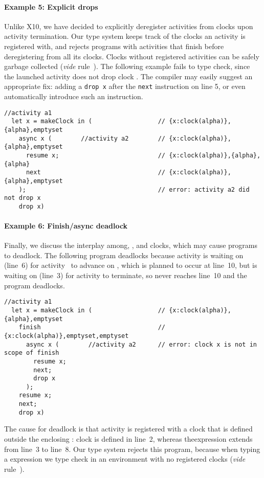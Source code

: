 \paragraph{Example 5: Explicit drops}

Unlike X10, we have decided to explicitly deregister activities from
clocks upon activity termination.
Our type system keeps track of the clocks an activity is registered
with, and rejects programs with activities that finish before
deregistering from all its clocks.
Clocks without registered activities can be safely garbage collected
(\textit{vide} rule~\Rdrop).
The following example fails to type check, since the launched
activity does not drop clock .
The compiler may easily suggest an appropriate fix: adding a
\lstinline|drop x| after the \lstinline|next| instruction on line 5,
or even automatically introduce such an instruction.
\begin{lstlisting}[numbers=right]
  //activity a1
  let x = makeClock in (                  // {x:clock(alpha)},{alpha},emptyset
    async x (        //activity a2        // {x:clock(alpha)},{alpha},emptyset
      resume x;                           // {x:clock(alpha)},{alpha},{alpha}
      next                                // {x:clock(alpha)},{alpha},emptyset
    );                                    // error: activity a2 did not drop x 
    drop x)
\end{lstlisting}


\paragraph{Example 6: Finish/async deadlock}

Finally, we discuss the interplay among\finishk\!, , and
clocks, which may cause programs to deadlock. 
The following program deadlocks because activity  is waiting on
 (line~6) for activity~ to advance on , which is
planned to occur at line~10, but  is waiting on
 (line~3) for activity  to terminate, so  never
reaches line~10 and the program deadlocks.
\begin{lstlisting}[numbers=right]
  //activity a1
  let x = makeClock in (                  // {x:clock(alpha)},{alpha},emptyset
    finish                                // {x:clock(alpha)},emptyset,emptyset
      async x (        //activity a2      // error: clock x is not in scope of finish
        resume x; 
        next; 
        drop x
      ); 
    resume x;
    next;
    drop x)
\end{lstlisting}
The cause for deadlock is that activity  is registered with a clock
that is defined outside the enclosing \finishk\!: clock  is defined
in line~2, whereas the\finishk expression extends from line~3 to line~8.
Our type system rejects this program, because when typing a expression we type check  in an environment 
with no registered clocks (\textit{vide} rule~\Rfinish). 


